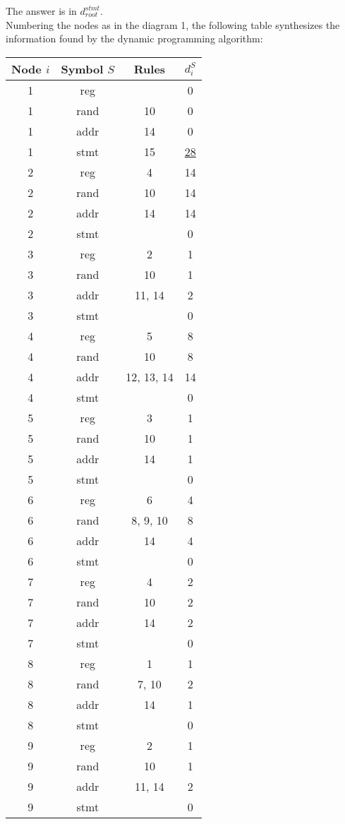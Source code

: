 The answer is in $d_{root}^{stmt}$. \\
Numbering the nodes as in the diagram 1, the following table synthesizes the information found by the dynamic programming algorithm:

\begin{tabular}{|c|c|c|c|}

\hline
Node $i$ & Symbol $S$ & Rules & $d_i^S$ \\
\hline
1 & reg & & 0 \\
\hline
1 & rand & 10 & 0 \\
\hline
1 & addr & 14 & 0 \\
\hline
1 & stmt & 15 & \underline{28} \\
\hline

2 & reg & 4 & 14\\
\hline
2 & rand & 10 & 14\\
\hline
2 & addr & 14 & 14\\
\hline
2 & stmt & & 0 \\
\hline

3 & reg & 2 & 1\\
\hline
3 & rand & 10 & 1\\
\hline
3 & addr & 11, 14 & 2\\
\hline
3 & stmt & & 0 \\
\hline

4 & reg & 5 & 8\\
\hline
4 & rand & 10 & 8\\
\hline
4 & addr & 12, 13, 14& 14 \\
\hline
4 & stmt & & 0 \\

\hline
5 & reg & 3 & 1\\
\hline
5 & rand & 10 & 1\\
\hline
5 & addr & 14 & 1\\
\hline
5 & stmt & & 0 \\
\hline

6 & reg & 6 & 4\\
\hline
6 & rand & 8, 9, 10& 8\\
\hline
6 & addr & 14 & 4 \\
\hline
6 & stmt & & 0 \\
\hline

7 & reg & 4 & 2 \\
\hline
7 & rand & 10 & 2 \\
\hline
7 & addr & 14 & 2 \\
\hline
7 & stmt & & 0 \\
\hline

8 & reg & 1 & 1 \\
\hline
8 & rand & 7, 10 & 2 \\
\hline
8 & addr & 14 & 1\\
\hline
8 & stmt & & 0 \\
\hline

9 & reg & 2 & 1 \\
\hline
9 & rand & 10 & 1 \\
\hline
9 & addr & 11, 14& 2\\
\hline
9 & stmt & & 0 \\
\hline
\end{tabular}
